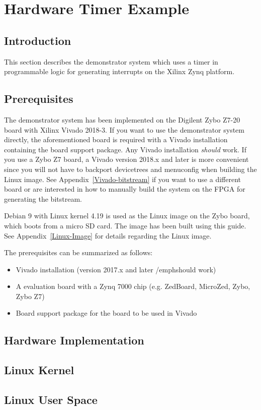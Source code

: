 \section{Hardware Timer Example}

\subsection{Introduction}\label{demo-intro}
This section describes the demonstrator system which uses a timer in programmable logic for generating interrupts on the Xilinx Zynq platform.


\subsection{Prerequisites}
The demonstrator system has been implemented on the Digilent Zybo Z7-20 board with Xilinx Vivado 2018-3.
If you want to use the demonstrator system directly, the aforementioned board is required with a Vivado installation containing the board support package.
Any Vivado installation \emph{should} work.
If you use a Zybo Z7 board, a Vivado version 2018.x and later is more convenient since you will not have to backport devicetrees and menuconfig when building the Linux image.
See Appendix~\ref{Vivado-bitstream} if you want to use a different board or are interested in how to manually build the system on the FPGA for generating the bitstream.

Debian 9 with Linux kernel 4.19 is used as the Linux image on the Zybo board, which boots from a micro SD card.
The image has been built using this \cite{DebianImage} guide.
See Appendix~\ref{Linux-Image} for details regarding the Linux image.

The prerequisites can be summarized as follows:
\begin{itemize}
\item Vivado installation (version 2017.x and later /emph{should} work)
\item A evaluation board with a Zynq 7000 chip (e.g. ZedBoard, MicroZed, Zybo, Zybo Z7)
\item Board support package for the board to be used in Vivado
\end{itemize}

\subsection{Hardware Implementation}


\subsection{Linux Kernel}\label{kernel}


\subsection{Linux User Space}
